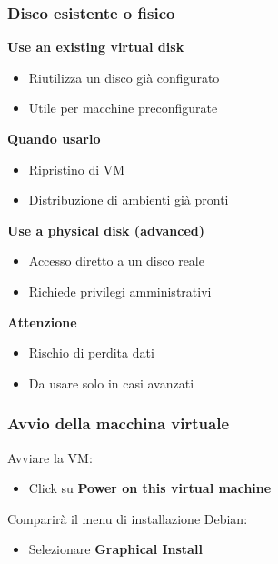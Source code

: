 \documentclass{beamer}
\begin{document}
	\begin{frame}
		\frametitle{Disco esistente o fisico}
		
		\textbf{Use an existing virtual disk}
		\begin{itemize}
			\item Riutilizza un disco già configurato
			\item Utile per macchine preconfigurate
		\end{itemize}
		
		\vspace{0.4cm}
		
		\textbf{Quando usarlo}
		\begin{itemize}
			\item Ripristino di VM
			\item Distribuzione di ambienti già pronti
		\end{itemize}
		
		\vspace{0.5cm}
		
		\textbf{Use a physical disk (advanced)}
		\begin{itemize}
			\item Accesso diretto a un disco reale
			\item Richiede privilegi amministrativi
		\end{itemize}
		
		\vspace{0.4cm}
		
		\textbf{Attenzione}
		\begin{itemize}
			\item Rischio di perdita dati
			\item Da usare solo in casi avanzati
		\end{itemize}
		
	\end{frame}
	
	
	\begin{frame}
		\frametitle{Avvio della macchina virtuale}
		
		Avviare la VM:
		
		\begin{itemize}
			\item Click su \textbf{Power on this virtual machine}
		\end{itemize}
		
		Comparirà il menu di installazione Debian:
		
		\begin{itemize}
			\item Selezionare \textbf{Graphical Install}
		\end{itemize}
		
	\end{frame}
	
\end{document}
